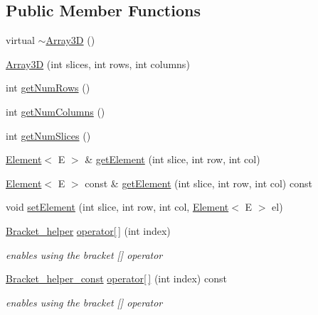 \subsection*{Public Member Functions}
\begin{DoxyCompactItemize}
\item 
virtual \hyperlink{classbridges_1_1datastructure_1_1_array3_d_afad3212fe6c2954859a7ea6dce7a739c}{$\sim$\+Array3D} ()
\item 
\hyperlink{classbridges_1_1datastructure_1_1_array3_d_af2d55bb9cf9057b9d5af4a24c6dc3173}{Array3D} (int slices, int rows, int columns)
\item 
int \hyperlink{classbridges_1_1datastructure_1_1_array3_d_a73aebe1098512ca4196cb8da0eb493fe}{get\+Num\+Rows} ()
\item 
int \hyperlink{classbridges_1_1datastructure_1_1_array3_d_acbd00c0c4448ff7ff03c76bc0701f602}{get\+Num\+Columns} ()
\item 
int \hyperlink{classbridges_1_1datastructure_1_1_array3_d_ad2fb0a0b8be702944c25b6fc807263f7}{get\+Num\+Slices} ()
\item 
\hyperlink{classbridges_1_1datastructure_1_1_element}{Element}$<$ E $>$ \& \hyperlink{classbridges_1_1datastructure_1_1_array3_d_a1e4a2bea4f3a292289cfc0a4d530108f}{get\+Element} (int slice, int row, int col)
\item 
\hyperlink{classbridges_1_1datastructure_1_1_element}{Element}$<$ E $>$ const  \& \hyperlink{classbridges_1_1datastructure_1_1_array3_d_a8f9d33a89196ef13839f30334b25476d}{get\+Element} (int slice, int row, int col) const
\item 
void \hyperlink{classbridges_1_1datastructure_1_1_array3_d_aaad4c68544d51cade79f318230ab2bcf}{set\+Element} (int slice, int row, int col, \hyperlink{classbridges_1_1datastructure_1_1_element}{Element}$<$ E $>$ el)
\item 
\hyperlink{structbridges_1_1datastructure_1_1_array3_d_1_1_bracket__helper}{Bracket\+\_\+helper} \hyperlink{classbridges_1_1datastructure_1_1_array3_d_a0b285b00e5d152d2968bee6b3aaf9349}{operator\mbox{[}$\,$\mbox{]}} (int index)
\begin{DoxyCompactList}\small\item\em enables using the bracket \mbox{[}\mbox{]} operator \end{DoxyCompactList}\item 
\hyperlink{structbridges_1_1datastructure_1_1_array3_d_1_1_bracket__helper__const}{Bracket\+\_\+helper\+\_\+const} \hyperlink{classbridges_1_1datastructure_1_1_array3_d_acfc0446c919e7ca70cc31d0624b3bcd1}{operator\mbox{[}$\,$\mbox{]}} (int index) const
\begin{DoxyCompactList}\small\item\em enables using the bracket \mbox{[}\mbox{]} operator \end{DoxyCompactList}\end{DoxyCompactItemize}
